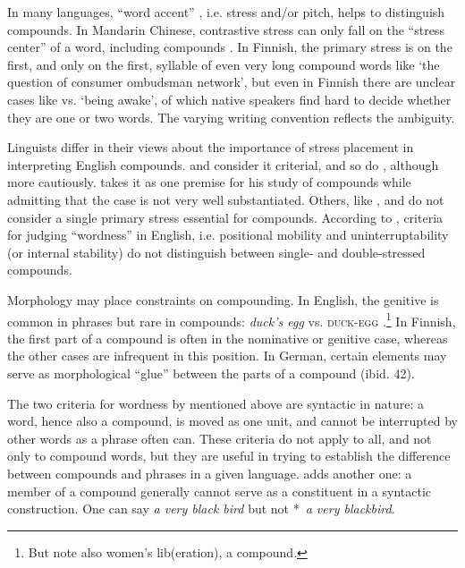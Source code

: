 In many languages, ``word accent'' \citep[204]{Lyons1968}, i.e. stress and/or pitch, helps to distinguish compounds. In Mandarin Chinese, contrastive stress can only fall on the ``stress center'' of a word, including compounds \citep[41]{Anderson1985a}. In Finnish, the primary stress is on the first, and only on the first, syllable of even very long compound words like  `the question of consumer ombudsman network', but even in Finnish there are unclear cases like  vs.  `being awake', of which native speakers find hard to decide whether they are one or two words. The varying writing convention reflects the ambiguity. 

Linguists differ in their views about the importance of stress placement in interpreting English compounds. \citet[228]{Bloomfield1933} and \citet[41]{Anderson1985a} consider it criterial, and so do \citet[1330]{QuirkEtAl1989}, although more cautiously. \citet[120]{Lees1968} takes it as one premise for his study of compounds while admitting that the case is not very well substantiated. Others, like \citet[31]{Jespersen1933}, \citet{Downing1977} and \citet{Bauer1983} do not consider a single primary stress essential for compounds. According to \citet[105]{Bauer1983},  criteria for judging ``wordness'' in English, i.e. positional mobility and uninterruptability (or internal stability) do not distinguish between single- and double-stressed compounds.

Morphology may place constraints on compounding. In English, the genitive is common in phrases but rare in compounds: \textit{duck's egg} vs. \textsc{duck-egg} \citep[41]{Anderson1985a}.\footnote{But note also women's lib(eration), a compound.} In Finnish, the first part of a compound is often in the nominative or genitive case, whereas the other cases are infrequent in this position. In German, certain elements may serve as morphological ``glue'' between the parts of a compound (ibid. 42).

The two criteria for wordness by \citet[202]{Lyons1968} mentioned above are syntactic in nature: a word, hence also a compound, is moved as one unit, and cannot be interrupted by other words as a phrase often can. These criteria do not apply to all, and not only to compound words, but they are useful in trying to establish the difference between compounds and phrases in a given language. \citet[232]{Bloomfield1933} adds another one: a member of a compound generally cannot serve as a constituent in a syntactic construction. One can say \textit{a very black bird} but not *~\textit{a very blackbird}.

